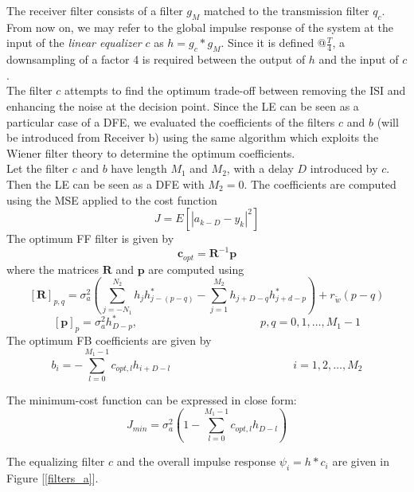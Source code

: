 \documentclass[a4paper, 12pt]{report}
\begin{document}
The receiver filter consists of a filter $g_M$ matched to the transmission filter $q_c$. From now on, we may refer to the global impulse response of the system at the input of the \textit{linear equalizer} $c$ as $h = g_c * g_M$. Since it is defined @$\frac{T}{4}$, a downsampling of a factor 4 is required between the output of $h$ and the input of $c$. \\
The filter $c$ attempts to find the optimum trade-off between removing the ISI and enhancing the noise at the decision point. Since the LE can be seen as a particular case of a DFE, we evaluated the coefficients of the filters $c$ and $b$ (will be introduced from Receiver b) using the same algorithm which exploits the Wiener filter theory to determine the optimum coefficients. \\
Let the filter $c$ and $b$ have length $M_1$ and $M_2$, with a delay $D$ introduced by $c$. Then the LE can be seen as a DFE with $M_2=0$. The coefficients are computed using the MSE applied to the cost function
\begin{equation}
J = E \left[|a_{k-D}-y_k|^2\right]
\end{equation}
The optimum FF filter is given by
\begin{equation*}
\mathbf{c}_{opt} = \mathbf{R}^{-1}\mathbf{p}
\end{equation*}
where the matrices $\mathbf{R}$ and $\mathbf{p}$ are computed using
\begin{equation}
\mathbf{[R]}_{p,q} = \sigma_a^2 \left( \sum_{j=-N_1}^{N_2}h_jh^*_{j-(p-q)}-\sum_{j=1}^{M_2}h_{j+D-q}h^*_{j+d-p} \right) + r_{\tilde{w}}(p-q)
\end{equation}
\begin{equation}
\mathbf{[p]}_p = \sigma_a^2 h^*_{D-p}, \quad\quad\quad\quad\quad\quad\quad\quad\quad\quad\quad p,q = 0,1,\dots,M_1-1
\end{equation}
The optimum FB coefficients are given by
\begin{equation}
b_i = -\sum_{l=0}^{M_1-1}c_{opt,l}h_{i+D-l} \quad\quad\quad\quad\quad\quad\quad\quad\quad\quad\quad i =1,2,\dots,M_2
\end{equation}

The minimum-cost function can be expressed in close form:
\begin{equation}
J_{min} = \sigma^2_a \left( 1-\sum_{l=0}^{M_1-1} c_{opt,l}h_{D-l}\right)
\end{equation}

The equalizing filter $c$ and the overall impulse response $\psi_i=h*c_i$ are given in Figure [\ref{filters_a}].
\end{document}
